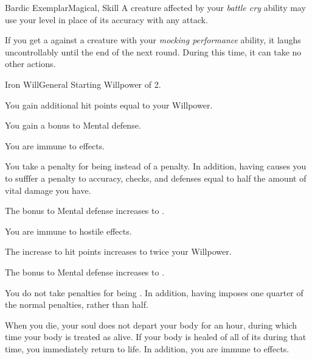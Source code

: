 \begin{feat}{Bardic Exemplar}{Magical, Skill}
         A creature affected by your \textit{battle cry} ability may use your level in place of its accuracy with any attack.

         If you get a  against a creature with your \textit{mocking performance} ability, it laughs uncontrollably until the end of the next round.
        During this time, it can take no other actions.
    \end{feat}

    \begin{feat}{Iron Will}{General}
        \featpre Starting Willpower of 2.
        \featben

         You gain additional hit points equal to your Willpower.

         You gain a  bonus to Mental defense.

         You are immune to  effects.

         You take a  penalty for being  instead of a  penalty.
        In addition, having  causes you to sufffer a penalty to accuracy, checks, and defenses equal to half the amount of vital damage you have.

         The bonus to Mental defense increases to .

         You are immune to hostile  effects.

         The increase to hit points increases to twice your Willpower.

         The bonus to Mental defense increases to .

         You do not take penalties for being .
        In addition, having  imposes one quarter of the normal penalties, rather than half.

         When you die, your soul does not depart your body for an hour, during which time your body is treated as alive.
        If your body is healed of all of its  during that time, you immediately return to life.
        In addition, you are immune to  effects.
    \end{feat}

